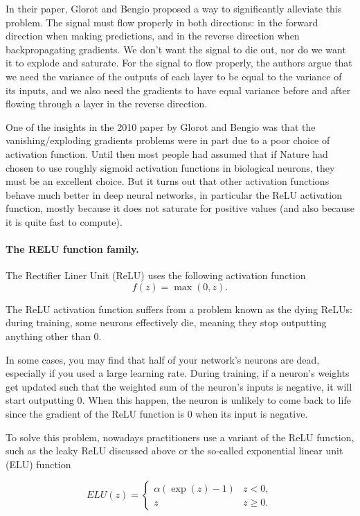 \documentclass[%
oneside,                 %
final,                   %
10pt]{article}
\begin{document}
In their paper, Glorot and Bengio proposed a way to significantly
alleviate this problem. The signal must flow properly in both
directions: in the forward direction when making predictions, and in
the reverse direction when backpropagating gradients. We don’t want
the signal to die out, nor do we want it to explode and saturate. For
the signal to flow properly, the authors argue that we need the
variance of the outputs of each layer to be equal to the variance of
its inputs, and we also need the gradients to have equal variance
before and after flowing through a layer in the reverse direction.



One of the insights in the 2010 paper by Glorot and Bengio was that
the vanishing/exploding gradients problems were in part due to a poor
choice of activation function. Until then most people had assumed that
if Nature had chosen to use roughly sigmoid activation functions in
biological neurons, they must be an excellent choice. But it turns out
that other activation functions behave much better in deep neural
networks, in particular the ReLU activation function, mostly because
it does not saturate for positive values (and also because it is quite
fast to compute).


\paragraph{The RELU function family.}
The Rectifier Liner Unit (ReLU) uses the following activation function
\[
f(z) = \max(0,z).
\]

The ReLU activation function suffers from a problem known as the dying
ReLUs: during training, some neurons effectively die, meaning they
stop outputting anything other than 0.

In some cases, you may find that half of your network’s neurons are
dead, especially if you used a large learning rate. During training,
if a neuron’s weights get updated such that the weighted sum of the
neuron’s inputs is negative, it will start outputting 0. When this
happen, the neuron is unlikely to come back to life since the gradient
of the ReLU function is 0 when its input is negative.

To solve this problem, nowadays practitioners use a  variant of the ReLU
function, such as the leaky ReLU discussed above or the so-called
exponential linear unit (ELU) function

\[
ELU(z) = \left\{\begin{array}{cc} \alpha\left( \exp{(z)}-1\right) & z < 0,\\  z & z \ge 0.\end{array}\right. 
\]
\end{document}
